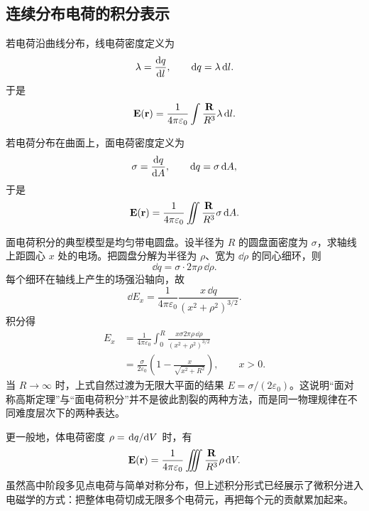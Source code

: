 \subsection*{连续分布电荷的积分表示}

若电荷沿曲线分布，线电荷密度定义为
\begin{equation}
\lambda = \dv{q}{l}, \qquad \dd q = \lambda\,\dd l.
\end{equation}
于是
\begin{equation}
\vb{E}(\vb{r}) = \frac{1}{4\pi\varepsilon_0}\int \frac{\vb{R}}{R^3}\lambda\,\dd l.
\end{equation}

若电荷分布在曲面上，面电荷密度定义为
\begin{equation}
\sigma = \dv{q}{A}, \qquad \dd q = \sigma\,\dd A,
\end{equation}
于是
\begin{equation}
\vb{E}(\vb{r}) = \frac{1}{4\pi\varepsilon_0}\iint \frac{\vb{R}}{R^3}\sigma\,\dd A.
\end{equation}

面电荷积分的典型模型是均匀带电圆盘。设半径为 $R$ 的圆盘面密度为 $\sigma$，求轴线上距圆心 $x$ 处的电场。把圆盘分解为半径为 $\rho$、宽为 $\dd\rho$ 的同心细环，则
\begin{equation}
\dd q = \sigma\cdot 2\pi\rho\,\dd\rho.
\end{equation}
每个细环在轴线上产生的场强沿轴向，故
\begin{equation}
\dd E_x = \frac{1}{4\pi\varepsilon_0}\frac{x\,\dd q}{(x^2+\rho^2)^{3/2}}.
\end{equation}
积分得
\begin{align}
E_x &= \frac{1}{4\pi\varepsilon_0}\int_0^R \frac{x\sigma 2\pi\rho\,\dd\rho}{(x^2+\rho^2)^{3/2}} \\
&= \frac{\sigma}{2\varepsilon_0}\left(1-\frac{x}{\sqrt{x^2+R^2}}\right), \qquad x>0.
\end{align}
当 $R\to\infty$ 时，上式自然过渡为无限大平面的结果 $E=\sigma/(2\varepsilon_0)$。这说明“面对称高斯定理”与“面电荷积分”并不是彼此割裂的两种方法，而是同一物理规律在不同难度层次下的两种表达。

更一般地，体电荷密度 $\rho=\dv*{q}{V}$ 时，有
\begin{equation}
\vb{E}(\vb{r}) = \frac{1}{4\pi\varepsilon_0}\iiint \frac{\vb{R}}{R^3}\rho\,\dd V.
\end{equation}
虽然高中阶段多见点电荷与简单对称分布，但上述积分形式已经展示了微积分进入电磁学的方式：把整体电荷切成无限多个电荷元，再把每个元的贡献累加起来。

